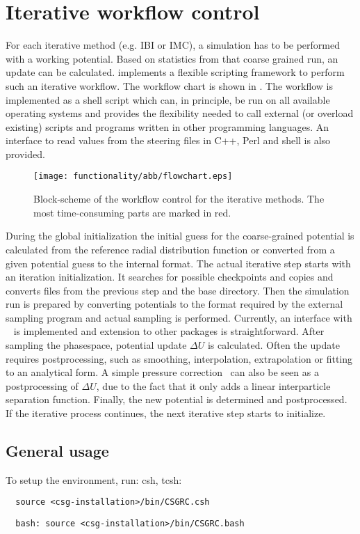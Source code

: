 \section{Iterative workflow control}
For each iterative method (e.g. IBI or IMC), a simulation has to be performed with a working potential. Based on statistics from that coarse grained run, an update can be calculated. \votca implements a flexible scripting framework to perform such an iterative workflow. The workflow chart is shown in . The workflow is implemented as a shell script which can, in principle, be run on all available operating systems and provides the flexibility needed to call external (or overload existing) scripts and programs written in other programming languages. An interface to read values from the steering \xml files in C++, Perl and shell is also provided.

\begin{figure}
  \texttt{[image: functionality/abb/flowchart.eps]}
  \caption{
    \label{fig:flowchart}
    Block-scheme of the workflow control for the iterative methods. The most time-consuming parts are marked in red.
  }
\end{figure}

During the global initialization the initial guess for the coarse-grained potential is calculated from the reference radial distribution function or converted from a given potential guess to the internal format. The actual iterative step starts with an iteration initialization. It searches for possible checkpoints and copies and converts files from the previous step and the base directory. Then the simulation run is prepared by converting potentials to the format required by the external sampling program and actual sampling is performed. Currently, an interface with \gromacs~\cite{gromacs4} is implemented and extension to other packages is straightforward. After sampling the phasespace, potential update $\Delta U$ is calculated. Often the update requires postprocessing, such as smoothing, interpolation, extrapolation or fitting to an analytical form. A simple pressure correction~\cite{Reith:2003} can also be seen as a postprocessing of $\Delta U$, due to the fact that it only adds a linear interparticle separation function.
%
Finally, the new potential is determined and postprocessed. If the iterative process continues, the next iterative step starts to initialize.

\subsection{General usage}
To setup the environment, run:
csh, tcsh:
\begin{verbatim}
  source <csg-installation>/bin/CSGRC.csh
\end{verbatim}
\begin{verbatim}
  bash: source <csg-installation>/bin/CSGRC.bash
\end{verbatim}

